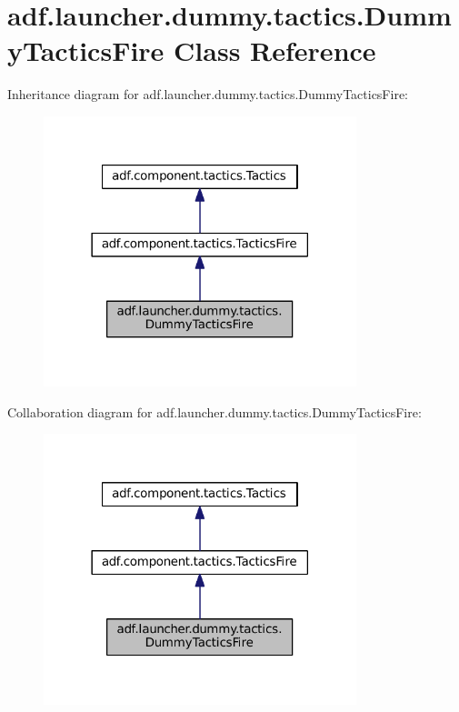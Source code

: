 \hypertarget{classadf_1_1launcher_1_1dummy_1_1tactics_1_1DummyTacticsFire}{}\section{adf.\+launcher.\+dummy.\+tactics.\+Dummy\+Tactics\+Fire Class Reference}
\label{classadf_1_1launcher_1_1dummy_1_1tactics_1_1DummyTacticsFire}


Inheritance diagram for adf.\+launcher.\+dummy.\+tactics.\+Dummy\+Tactics\+Fire\+:
\nopagebreak
\begin{figure}[H]
\begin{center}
\leavevmode
\includegraphics[width=258pt]{classadf_1_1launcher_1_1dummy_1_1tactics_1_1DummyTacticsFire__inherit__graph}
\end{center}
\end{figure}


Collaboration diagram for adf.\+launcher.\+dummy.\+tactics.\+Dummy\+Tactics\+Fire\+:
\nopagebreak
\begin{figure}[H]
\begin{center}
\leavevmode
\includegraphics[width=258pt]{classadf_1_1launcher_1_1dummy_1_1tactics_1_1DummyTacticsFire__coll__graph}
\end{center}
\end{figure}
